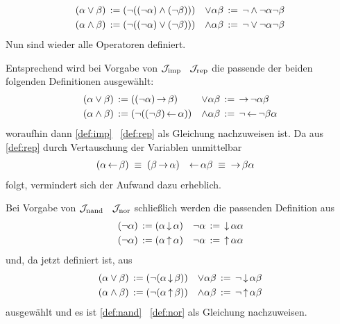 \begin{align}
	(\alpha \lor \beta)  & \;\operatorname{:\!\operatorname{=}}\; (\lnot((\lnot\alpha)\land(\lnot\beta))) &
	\lor \alpha  \beta   & \;\operatorname{:\!\operatorname{=}}\;  \lnot \land \lnot \alpha \lnot \beta
	\label{def:orand} \\
	(\alpha \land \beta) & \;\operatorname{:\!\operatorname{=}}\; (\lnot((\lnot\alpha)\lor(\lnot\beta)))  &
	\land \alpha  \beta  & \;\operatorname{:\!\operatorname{=}}\;  \lnot \lor \lnot \alpha \lnot \beta
	\label{def:andor}
\end{align}
Nun sind wieder alle Operatoren definiert.

Entsprechend wird bei Vorgabe von $\mathcal{J}_{\mathrm{imp}}$ \textbzgl\ $\mathcal{J}_{\mathrm{rep}}$ die passende der beiden folgenden Definitionen ausgewählt:
\begin{align}
	(\alpha \lor  \beta) & \;\operatorname{:\!\operatorname{=}}\; ((\lnot \alpha) \operatorname{\rightarrow} \beta)         &
	\lor \alpha   \beta  & \;\operatorname{:\!\operatorname{=}}\;   \operatorname{\rightarrow} \lnot \alpha \beta
	\label{def:orrep}
	\\
	(\alpha \land \beta) & \;\operatorname{:\!\operatorname{=}}\; (\lnot ((\lnot \beta) \operatorname{\leftarrow} \alpha)) &
	\land \alpha  \beta  & \;\operatorname{:\!\operatorname{=}}\;  \lnot \operatorname{\leftarrow} \lnot \beta \alpha
	\label{def:andrep}
\end{align}
woraufhin dann \eqref{def:imp} \textbzgl\ \eqref{def:rep} als Gleichung nachzuweisen ist.
Da aus \eqref{def:rep} durch Vertauschung der Variablen unmittelbar
\begin{align}
	(\alpha \operatorname{\leftarrow} \beta) & \;\equiv\; (\beta \operatorname{\rightarrow} \alpha) &
	\operatorname{\leftarrow} \alpha  \beta  & \;\equiv\;  \operatorname{\rightarrow} \beta \alpha  \label{eq:repimp}
\end{align}
folgt, vermindert sich der Aufwand dazu erheblich.

Bei Vorgabe von $\mathcal{J}_{\mathrm{nand}}$ \textbzgl\ $\mathcal{J}_{\mathrm{nor}}$ schließlich werden die passenden Definition aus
\begin{align}
	(\lnot \alpha) & \;\operatorname{:\!\operatorname{=}}\; (\alpha \operatorname{\downarrow} \alpha)  &
	\lnot  \alpha  & \;\operatorname{:\!\operatorname{=}}\;  \operatorname{\downarrow} \alpha \alpha   \label{def:notnor} \\
	(\lnot \alpha) & \;\operatorname{:\!\operatorname{=}}\; (\alpha \operatorname{\uparrow} \alpha) &
	\lnot  \alpha  & \;\operatorname{:\!\operatorname{=}}\;  \operatorname{\uparrow} \alpha \alpha  \label{def:notnand}
\end{align}
und, da \symqt{$\lnot$} jetzt definiert ist, aus
\begin{align}
	(\alpha \lor \beta)  & \;\operatorname{:\!\operatorname{=}}\; (\lnot(\alpha \operatorname{\downarrow} \beta))  &
	\lor \alpha  \beta   & \;\operatorname{:\!\operatorname{=}}\;  \lnot \operatorname{\downarrow} \alpha \beta
	\label{def:ornor} \\
	(\alpha \land \beta) & \;\operatorname{:\!\operatorname{=}}\; (\lnot(\alpha \operatorname{\uparrow} \beta)) &
	\land \alpha  \beta  & \;\operatorname{:\!\operatorname{=}}\;  \lnot \operatorname{\uparrow} \alpha \beta
	\label{def:andnand}
\end{align}
ausgewählt und es ist \eqref{def:nand} \textbzgl\ \eqref{def:nor} als Gleichung nachzuweisen.

